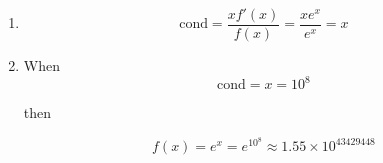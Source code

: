 \documentclass[11pt]{article}
\begin{document}
	\begin{enumerate}
		\item 
		\[\text{cond} = \frac{xf'(x)}{f(x)} = \frac{xe^x}{e^x} = x\]
		\item When
		\[\text{cond} = x = 10^8\]
		
		then
		
		\[f(x) = e^x = e^{10^8} \approx 1.55 \times 10^{43429448}\]
		
	\end{enumerate}
\end{document}
